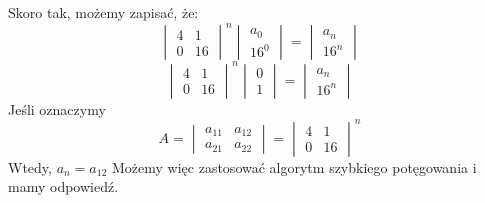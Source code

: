 \documentclass[a4paper]{article}
\begin{document}
Skoro tak, możemy zapisać, że:\\
$$\begin{vmatrix}
4 & 1 \\
0 & 16
\end{vmatrix}^n\begin{vmatrix}
a_0\\
16^0
\end{vmatrix}=\begin{vmatrix}
a_{n}\\
16^{n}
\end{vmatrix} $$
$$\begin{vmatrix}
4 & 1 \\
0 & 16
\end{vmatrix}^n\begin{vmatrix}
0\\
1
\end{vmatrix}=\begin{vmatrix}
a_{n}\\
16^{n}
\end{vmatrix} $$
Jeśli oznaczymy 
$$A=\begin{vmatrix}
a_{11} & a_{12} \\
a_{21} & a_{22}
\end{vmatrix}=\begin{vmatrix}
4 & 1 \\
0 & 16
\end{vmatrix}^n$$
Wtedy, $a_n=a_{12}$ Możemy więc zastosować algorytm szybkiego potęgowania i mamy odpowiedź.
\end{document}
